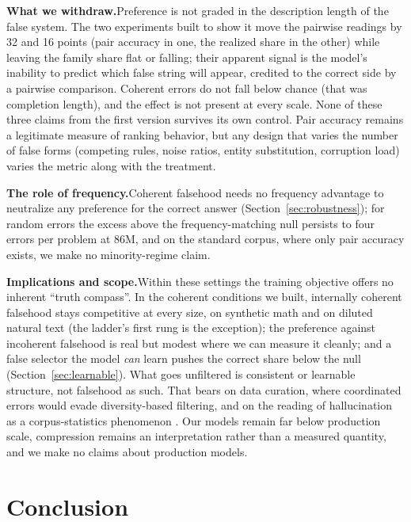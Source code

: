\documentclass{article}
\begin{document}
\textbf{What we withdraw.}\quad Preference is not graded in the description length of the false system. The two experiments built to show it move the pairwise readings by 32 and 16 points (pair accuracy in one, the realized share in the other) while leaving the family share flat or falling; their apparent signal is the model's inability to predict which false string will appear, credited to the correct side by a pairwise comparison. Coherent errors do not fall below chance (that was completion length), and the effect is not present at every scale. None of these three claims from the first version survives its own control. Pair accuracy remains a legitimate measure of ranking behavior, but any design that varies the number of false forms (competing rules, noise ratios, entity substitution, corruption load) varies the metric along with the treatment.

\textbf{The role of frequency.}\quad Coherent falsehood needs no frequency advantage to neutralize any preference for the correct answer (Section~\ref{sec:robustness}); for random errors the excess above the frequency-matching null persists to four errors per problem at 86M, and on the standard corpus, where only pair accuracy exists, we make no minority-regime claim.

\textbf{Implications and scope.}\quad Within these settings the training objective offers no inherent ``truth compass''. In the coherent conditions we built, internally coherent falsehood stays competitive at every size, on synthetic math and on diluted natural text (the ladder's first rung is the exception); the preference against incoherent falsehood is real but modest where we can measure it cleanly; and a false selector the model \emph{can} learn pushes the correct share below the null (Section~\ref{sec:learnable}). What goes unfiltered is consistent or learnable structure, not falsehood as such. That bears on data curation, where coordinated errors would evade diversity-based filtering, and on the reading of hallucination as a corpus-statistics phenomenon \citep{kalai2024calibrated}. Our models remain far below production scale, compression remains an interpretation rather than a measured quantity, and we make no claims about production models.

\section{Conclusion}
\end{document}
